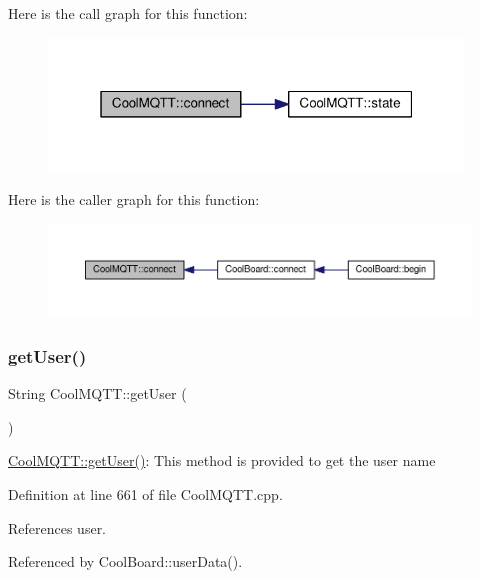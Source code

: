 Here is the call graph for this function\+:
\nopagebreak
\begin{figure}[H]
\begin{center}
\leavevmode
\includegraphics[width=313pt]{classCoolMQTT_a50075d0ab23a327ab897fd6adad20eda_cgraph}
\end{center}
\end{figure}
Here is the caller graph for this function\+:
\nopagebreak
\begin{figure}[H]
\begin{center}
\leavevmode
\includegraphics[width=350pt]{classCoolMQTT_a50075d0ab23a327ab897fd6adad20eda_icgraph}
\end{center}
\end{figure}
\mbox{\label{classCoolMQTT_a373cc92fca7760d886f02d8a6e5b3f63}} 
\subsubsection{\texorpdfstring{get\+User()}{getUser()}}
{\footnotesize\ttfamily String Cool\+M\+Q\+T\+T\+::get\+User (\begin{DoxyParamCaption}{ }\end{DoxyParamCaption})}

\hyperlink{classCoolMQTT_a373cc92fca7760d886f02d8a6e5b3f63}{Cool\+M\+Q\+T\+T\+::get\+User()}\+: This method is provided to get the user name 

Definition at line 661 of file Cool\+M\+Q\+T\+T.\+cpp.



References user.



Referenced by Cool\+Board\+::user\+Data().


